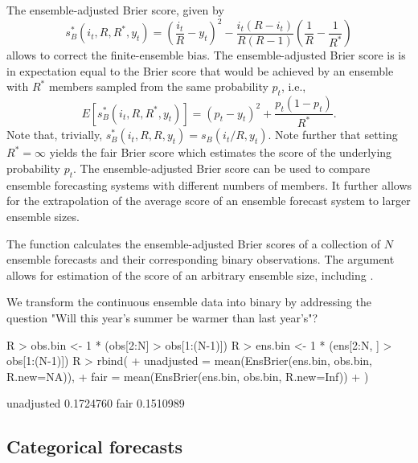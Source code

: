 \documentclass[article]{jss}
\begin{document}
The ensemble-adjusted Brier score, given by \citep{ferro2008effect}
%
\begin{equation}
s_{B}^*(i_t, R, R^*, y_t) = \left(\frac{i_t}{R} - y_t\right)^2 - \frac{i_t(R-i_t)}{R(R-1)}\left(\frac{1}{R} - \frac{1}{R^*}\right)
\label{eq:ens-brier}
\end{equation}
%
allows to correct the finite-ensemble bias.
The ensemble-adjusted Brier score is is in expectation equal to the Brier score that would be achieved by an ensemble with $R^*$ members sampled from the same probability $p_t$, i.e., 
%
\begin{equation}
E\left[s_{B}^*(i_t, R, R^*, y_t)\right] = (p_t - y_t)^2 + \frac{p_t(1-p_t)}{R^*}.
\end{equation}
%
Note that, trivially, $s_{B}^*(i_t, R, R, y_t) = s_{B}(i_t/R, y_t)$.
Note further that setting $R^*=\infty$ yields the fair Brier score \citep{ferro2013fair} which estimates the score of the underlying probability $p_t$.
The ensemble-adjusted Brier score can be used to compare ensemble forecasting systems with different numbers of members.
It further allows for the extrapolation of the average score of an ensemble forecast system to larger ensemble sizes.


The  function  calculates the ensemble-adjusted Brier scores of a collection of $N$ ensemble forecasts and their corresponding binary observations. 
The argument  allows for estimation of the score of an arbitrary ensemble size, including .


We transform the continuous ensemble data into binary by addressing the question "Will this year's summer be warmer than last year's"?

\begin{Schunk}
\begin{Sinput}
R > obs.bin <- 1 * (obs[2:N] > obs[1:(N-1)])
R > ens.bin <- 1 * (ens[2:N, ] > obs[1:(N-1)])
R > rbind(
+   unadjusted = mean(EnsBrier(ens.bin, obs.bin, R.new=NA)),
+   fair       = mean(EnsBrier(ens.bin, obs.bin, R.new=Inf))
+ )
\end{Sinput}
\begin{Soutput}
                [,1]
unadjusted 0.1724760
fair       0.1510989
\end{Soutput}
\end{Schunk}



\subsection{Categorical forecasts}
\end{document}
